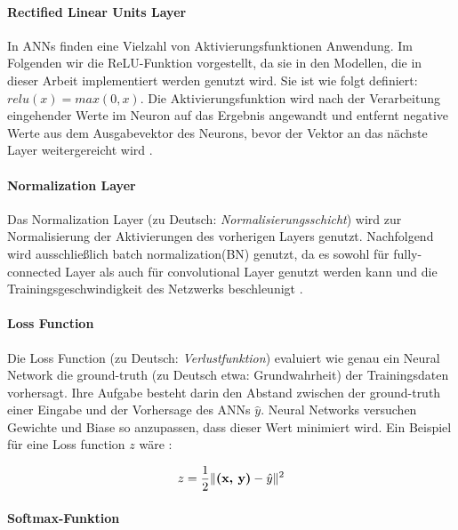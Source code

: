 \paragraph{Rectified Linear Units Layer}

In ANNs finden eine Vielzahl von Aktivierungsfunktionen Anwendung. Im Folgenden wir die ReLU-Funktion vorgestellt, da sie in den Modellen, die in dieser Arbeit implementiert werden genutzt wird. Sie ist wie folgt definiert: $relu(x) = max(0, x)$. Die Aktivierungsfunktion wird nach der Verarbeitung eingehender Werte im Neuron auf das Ergebnis angewandt und entfernt negative Werte aus dem Ausgabevektor des Neurons, bevor der Vektor an das n\"achste Layer weitergereicht wird \parencite{Wu.2017}.

\paragraph{Normalization Layer}

Das Normalization Layer (zu Deutsch: \textit{Normalisierungsschicht}) wird zur Normalisierung der Aktivierungen des vorherigen Layers genutzt. Nachfolgend wird ausschließlich batch normalization(BN) genutzt, da es sowohl f\"ur fully-connected Layer als auch f\"ur convolutional Layer genutzt werden kann und die Trainingsgeschwindigkeit des Netzwerks beschleunigt \parencite{DBLP:conf/icml/IoffeS15}.

\paragraph{Loss Function}

Die Loss Function (zu Deutsch: \textit{Verlustfunktion}) evaluiert wie genau ein Neural Network die ground-truth (zu Deutsch etwa: Grundwahrheit) der Trainingsdaten vorhersagt. Ihre Aufgabe besteht darin den Abstand zwischen der ground-truth  einer Eingabe  und der Vorhersage des ANNs $\hat{y}$. Neural Networks versuchen Gewichte und Biase so anzupassen, dass dieser Wert minimiert wird. Ein Beispiel f\"ur eine Loss function $z$ w\"are \parencite{Wu.2017}:

\begin{equation}
z = \frac{1}{2}\|\textbf{(x, y)} - \hat{y}\|^2
\end{equation}


\paragraph{Softmax-Funktion}

